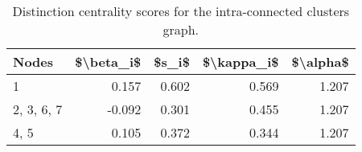 \begin{table}
\centering
\caption{\label{tab:intra}Distinction centrality scores for the intra-connected clusters graph.}
\centering
\begin{tabular}[t]{lrrrr}
\toprule
Nodes & \$\textbackslash{}beta\_i\$ & \$s\_i\$ & \$\textbackslash{}kappa\_i\$ & \$\textbackslash{}alpha\$\\
\midrule
1 & 0.157 & 0.602 & 0.569 & 1.207\\
2, 3, 6, 7 & -0.092 & 0.301 & 0.455 & 1.207\\
4, 5 & 0.105 & 0.372 & 0.344 & 1.207\\
\bottomrule
\end{tabular}
\end{table}
